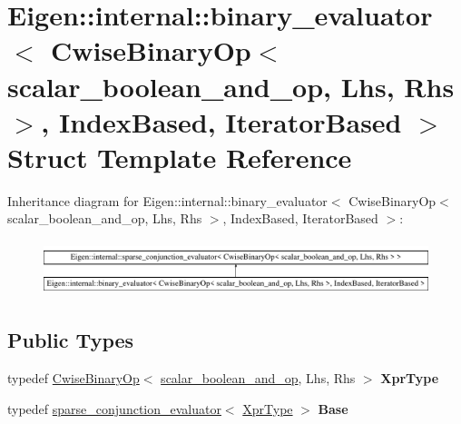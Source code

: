 \hypertarget{struct_eigen_1_1internal_1_1binary__evaluator_3_01_cwise_binary_op_3_01scalar__boolean__and__op_e5783d1feefabf80ecedbbd659dac347}{}\section{Eigen\+::internal\+::binary\+\_\+evaluator$<$ Cwise\+Binary\+Op$<$ scalar\+\_\+boolean\+\_\+and\+\_\+op, Lhs, Rhs $>$, Index\+Based, Iterator\+Based $>$ Struct Template Reference}
\label{struct_eigen_1_1internal_1_1binary__evaluator_3_01_cwise_binary_op_3_01scalar__boolean__and__op_e5783d1feefabf80ecedbbd659dac347}
Inheritance diagram for Eigen\+::internal\+::binary\+\_\+evaluator$<$ Cwise\+Binary\+Op$<$ scalar\+\_\+boolean\+\_\+and\+\_\+op, Lhs, Rhs $>$, Index\+Based, Iterator\+Based $>$\+:\begin{figure}[H]
\begin{center}
\leavevmode
\includegraphics[height=1.620839cm]{struct_eigen_1_1internal_1_1binary__evaluator_3_01_cwise_binary_op_3_01scalar__boolean__and__op_e5783d1feefabf80ecedbbd659dac347}
\end{center}
\end{figure}
\subsection*{Public Types}
\begin{DoxyCompactItemize}
\item 
\mbox{\label{struct_eigen_1_1internal_1_1binary__evaluator_3_01_cwise_binary_op_3_01scalar__boolean__and__op_e5783d1feefabf80ecedbbd659dac347_a2a82db452c49cad5c9b67cea350c2056}} 
typedef \mbox{\hyperlink{class_eigen_1_1_cwise_binary_op}{Cwise\+Binary\+Op}}$<$ \mbox{\hyperlink{struct_eigen_1_1internal_1_1scalar__boolean__and__op}{scalar\+\_\+boolean\+\_\+and\+\_\+op}}, Lhs, Rhs $>$ {\bfseries Xpr\+Type}
\item 
\mbox{\label{struct_eigen_1_1internal_1_1binary__evaluator_3_01_cwise_binary_op_3_01scalar__boolean__and__op_e5783d1feefabf80ecedbbd659dac347_a2a9680fe7d0f25cace3fcd416a365529}} 
typedef \mbox{\hyperlink{struct_eigen_1_1internal_1_1sparse__conjunction__evaluator}{sparse\+\_\+conjunction\+\_\+evaluator}}$<$ \mbox{\hyperlink{class_eigen_1_1_cwise_binary_op}{Xpr\+Type}} $>$ {\bfseries Base}
\end{DoxyCompactItemize}
